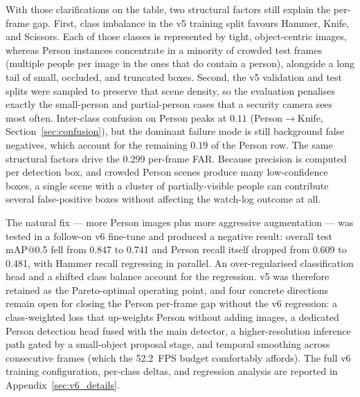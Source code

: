 \documentclass{ieeeaccess}
\begin{document}
With those clarifications on the table, two structural factors still explain the per-frame gap. First, class imbalance in the v5 training split favours Hammer, Knife, and Scissors. Each of those classes is represented by tight, object-centric images, whereas Person instances concentrate in a minority of crowded test frames (multiple people per image in the ones that do contain a person), alongside a long tail of small, occluded, and truncated boxes. Second, the v5 validation and test splits were sampled to preserve that scene density, so the evaluation penalises exactly the small-person and partial-person cases that a security camera sees most often. Inter-class confusion on Person peaks at $0.11$ (Person$\rightarrow$Knife, Section~\ref{sec:confusion}), but the dominant failure mode is still background false negatives, which account for the remaining $0.19$ of the Person row. The same structural factors drive the 0.299 per-frame FAR. Because precision is computed per detection box, and crowded Person scenes produce many low-confidence boxes, a single scene with a cluster of partially-visible people can contribute several false-positive boxes without affecting the watch-log outcome at all.

The natural fix --- more Person images plus more aggressive augmentation --- was tested in a follow-on v6 fine-tune and produced a negative result: overall test mAP{@}0.5 fell from 0.847 to 0.741 and Person recall itself dropped from 0.609 to 0.481, with Hammer recall regressing in parallel. An over-regularised classification head and a shifted class balance account for the regression. v5 was therefore retained as the Pareto-optimal operating point, and four concrete directions remain open for closing the Person per-frame gap without the v6 regression: a class-weighted loss that up-weights Person without adding images, a dedicated Person detection head fused with the main detector, a higher-resolution inference path gated by a small-object proposal stage, and temporal smoothing across consecutive frames (which the 52.2~FPS budget comfortably affords). The full v6 training configuration, per-class deltas, and regression analysis are reported in Appendix~\ref{sec:v6_details}.
\end{document}
